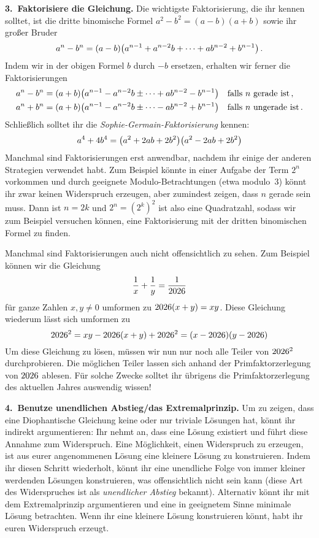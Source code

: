 \textbf{3.~Faktorisiere die Gleichung.} Die wichtigste Faktorisierung, die ihr kennen solltet, ist die dritte binomische Formel $a^2-b^2=(a-b)(a+b)$ sowie ihr großer Bruder
\begin{equation*}
	a^n-b^n=(a-b)\parens*{a^{n-1}+a^{n-2}b+\dotsb+ab^{n-2}+b^{n-1}}\,.
\end{equation*}
Indem wir in der obigen Formel $b$ durch $-b$ ersetzen, erhalten wir ferner die Faktorisierungen
\begin{align*}
	a^n-b^n&=(a+b)\parens*{a^{n-1}-a^{n-2}b\pm\dotsb+ab^{n-2}-b^{n-1}}\quad\text{falls $n$ gerade ist}\,,\\
	a^n+b^n&=(a+b)\parens*{a^{n-1}-a^{n-2}b\pm\dotsb-ab^{n-2}+b^{n-1}}\quad\text{falls $n$ ungerade ist}\,.
\end{align*}
Schließlich solltet ihr die \emph{Sophie-Germain-Faktorisierung} kennen:
\begin{equation*}
	a^4+4b^4=\parens*{a^2+2ab+2b^2}\parens*{a^2-2ab+2b^2}
\end{equation*}
Manchmal sind Faktorisierungen erst anwendbar, nachdem ihr einige der anderen Strategien verwendet habt. Zum Beispiel könnte in einer Aufgabe der Term $2^n$ vorkommen und durch geeignete Modulo-Betrachtungen (etwa modulo~$3$) könnt ihr zwar keinen Widerspruch erzeugen, aber zumindest zeigen, dass $n$ gerade sein muss. Dann ist $n=2k$ und $2^n=(2^{k})^2$ ist also eine Quadratzahl, sodass wir zum Beispiel versuchen können, eine Faktorisierung mit der dritten binomischen Formel zu finden.

Manchmal sind Faktorisierungen auch nicht offensichtlich zu sehen. Zum Beispiel können wir die Gleichung
\begin{equation*}
	\frac 1x+\frac 1y=\frac1{\the\year}
\end{equation*}
für ganze Zahlen $x,y\neq 0$ umformen zu $\the\year(x+y)=xy$. Diese Gleichung wiederum lässt sich umformen zu
\begin{equation*}
	\the\year^2=xy-\the\year(x+y)+\the\year^2=(x-\the\year)(y-\the\year)
\end{equation*} 
Um diese Gleichung zu lösen, müssen wir nun nur noch alle Teiler von $\the\year^2$ durchprobieren. Die möglichen Teiler lassen sich anhand der Primfaktorzerlegung von $\the\year$ ablesen. Für solche Zwecke solltet ihr übrigens die Primfaktorzerlegung des aktuellen Jahres auswendig wissen!

\textbf{4.~Benutze unendlichen Abstieg/das Extremalprinzip.} Um zu zeigen, dass eine Diophantische Gleichung keine oder nur triviale Lösungen hat, könnt ihr indirekt argumentieren: Ihr nehmt an, dass eine Lösung existiert und führt diese Annahme zum Widerspruch. Eine Möglichkeit, einen Widerspruch zu erzeugen, ist aus eurer angenommenen Lösung eine kleinere Lösung zu konstruieren. Indem ihr diesen Schritt wiederholt, könnt ihr eine unendliche Folge von immer kleiner werdenden Lösungen konstruieren, was offensichtlich nicht sein kann (diese Art des Widerspruches ist als \emph{unendlicher Abstieg} bekannt). Alternativ könnt ihr mit dem Extremalprinzip argumentieren und eine in geeignetem Sinne minimale Lösung betrachten. Wenn ihr eine kleinere Lösung konstruieren könnt, habt ihr euren Widerspruch erzeugt.

